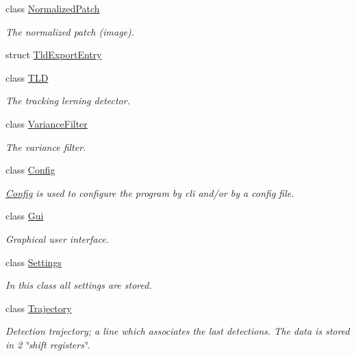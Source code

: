 \begin{DoxyCompactItemize}
class \hyperlink{classtld_1_1NormalizedPatch}{Normalized\-Patch}
\begin{DoxyCompactList}\small\item\em The normalized patch (image). \end{DoxyCompactList}\item 
struct \hyperlink{structtld_1_1TldExportEntry}{Tld\-Export\-Entry}
\item 
class \hyperlink{classtld_1_1TLD}{T\-L\-D}
\begin{DoxyCompactList}\small\item\em The tracking lerning detector. \end{DoxyCompactList}\item 
class \hyperlink{classtld_1_1VarianceFilter}{Variance\-Filter}
\begin{DoxyCompactList}\small\item\em The variance filter. \end{DoxyCompactList}\item 
class \hyperlink{classtld_1_1Config}{Config}
\begin{DoxyCompactList}\small\item\em \hyperlink{classtld_1_1Config}{Config} is used to configure the program by cli and/or by a config file. \end{DoxyCompactList}\item 
class \hyperlink{classtld_1_1Gui}{Gui}
\begin{DoxyCompactList}\small\item\em Graphical user interface. \end{DoxyCompactList}\item 
class \hyperlink{classtld_1_1Settings}{Settings}
\begin{DoxyCompactList}\small\item\em In this class all settings are stored. \end{DoxyCompactList}\item 
class \hyperlink{classtld_1_1Trajectory}{Trajectory}
\begin{DoxyCompactList}\small\item\em Detection trajectory; a line which associates the last detections. The data is stored in 2 \char`\"{}shift registers\char`\"{}. \end{DoxyCompactList}\end{DoxyCompactItemize}
